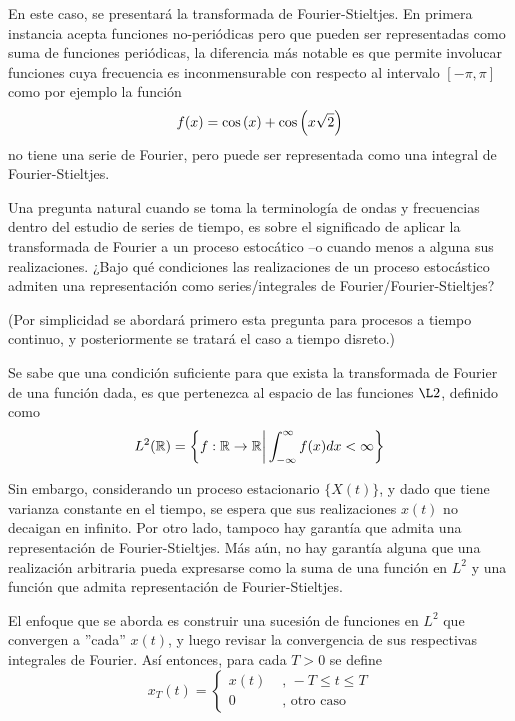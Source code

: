 En este caso, se presentar\'a la transformada de Fourier-Stieltjes. En primera instancia
acepta funciones no-peri\'odicas pero que pueden ser representadas como suma de funciones
peri\'odicas, la diferencia m\'as notable es que permite involucar funciones cuya frecuencia
es inconmensurable con respecto al intervalo $[-\pi,\pi]$ como por ejemplo la funci\'on
$$
f(x) = \mathrm{cos}\left( x \right) + \mathrm{cos}\left( x\sqrt{2} \right)
$$
no tiene una serie de Fourier, pero puede ser representada como una integral de Fourier-Stieltjes.


Una pregunta natural cuando se toma la terminolog\'ia de ondas y frecuencias dentro
del estudio de series de tiempo, es sobre el significado de aplicar la transformada de Fourier a
un proceso estoc\'atico --o cuando menos a alguna sus realizaciones.
¿Bajo qu\'e condiciones las realizaciones de un proceso estoc\'astico admiten una representaci\'on
como series/integrales de Fourier/Fourier-Stieltjes?

(Por simplicidad se abordar\'a primero esta pregunta para procesos a tiempo continuo, y 
posteriormente se tratar\'a el caso a tiempo disreto.)

Se sabe que una condici\'on suficiente para que exista la transformada de Fourier de una funci\'on
dada, es que pertenezca al espacio de las funciones $\L2$, definido como
\begin{equation*}
L^2(\mathbb{R}) = \left\{ f: \mathbb{R} \rightarrow \mathbb{R} {\biggr\rvert} \int_{-\infty}^{\infty} f(x) dx < \infty \right\}
\end{equation*}

Sin embargo, considerando un proceso estacionario $\{ X(t) \}$, y dado que tiene varianza constante 
en el tiempo, se 
espera que sus realizaciones $x(t)$ no decaigan en infinito. Por otro lado, tampoco hay garant\'ia
que admita una representaci\'on de Fourier-Stieltjes. M\'as a\'un, no hay garant\'ia alguna que
una realizaci\'on arbitraria pueda expresarse como la suma de una funci\'on en $L^2$ y una
funci\'on que admita representaci\'on de Fourier-Stieltjes.

El enfoque que se aborda es construir una sucesi\'on de funciones 
en $L^{2}$
que convergen a ''cada''
$x(t)$, y luego revisar la convergencia de sus respectivas integrales de Fourier.
As\'i entonces, para cada $T>0$ se define
\begin{equation}
x_T(t) = 
\begin{cases}
x(t) & \text{ , } -T\leq t \leq T
\\
0 & \text{ , otro caso}
\end{cases}
\end{equation}

